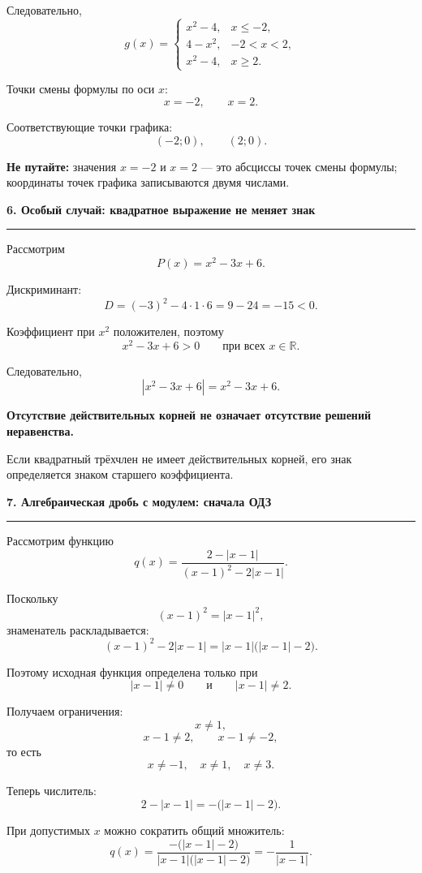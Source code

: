 \documentclass[a4paper,12pt]{article}
\newcommand{\lessonsection}[1]{%
    \vspace{0.6em}
    {\Large\bfseries\color{darkaccent}#1}\par
    \vspace{0.15em}
    {\color{softgray}\rule{\linewidth}{0.8pt}}
    \vspace{0.3em}
}
\newcommand{\important}[1]{%
    {\color{darkaccent}\bfseries #1}%
}
\newcommand{\R}{\mathbb{R}}
\begin{document}
Следовательно,
\[
\boxed{
g(x)=
\begin{cases}
x^2-4, & x\le -2,\\[1mm]
4-x^2, & -2<x<2,\\[1mm]
x^2-4, & x\ge 2.
\end{cases}}
\]

Точки смены формулы по оси \(x\):
\[
\boxed{x=-2,\qquad x=2}.
\]

Соответствующие точки графика:
\[
(-2;0),\qquad (2;0).
\]

\textbf{Не путайте:}
значения \(x=-2\) и \(x=2\) --- это абсциссы точек смены формулы;
координаты точек графика записываются двумя числами.


\lessonsection{6. Особый случай: квадратное выражение не меняет знак}

Рассмотрим
\[
P(x)=x^2-3x+6.
\]

Дискриминант:
\[
D=(-3)^2-4\cdot1\cdot6=9-24=-15<0.
\]

Коэффициент при \(x^2\) положителен, поэтому
\[
x^2-3x+6>0
\qquad\text{при всех }x\in\R.
\]

Следовательно,
\[
|x^2-3x+6|=x^2-3x+6.
\]

\important{Отсутствие действительных корней не означает отсутствие решений
неравенства.}

Если квадратный трёхчлен не имеет действительных корней, его знак
определяется знаком старшего коэффициента.


\lessonsection{7. Алгебраическая дробь с модулем: сначала ОДЗ}

Рассмотрим функцию
\[
q(x)=
\frac{2-|x-1|}
{(x-1)^2-2|x-1|}.
\]

Поскольку
\[
(x-1)^2=|x-1|^2,
\]
знаменатель раскладывается:
\[
(x-1)^2-2|x-1|
=
|x-1|\bigl(|x-1|-2\bigr).
\]

Поэтому исходная функция определена только при
\[
|x-1|\ne0
\qquad\text{и}\qquad
|x-1|\ne2.
\]

Получаем ограничения:
\[
x\ne1,
\]
\[
x-1\ne2,\qquad x-1\ne-2,
\]
то есть
\[
\boxed{x\ne-1,\quad x\ne1,\quad x\ne3}.
\]

Теперь числитель:
\[
2-|x-1|=
-\bigl(|x-1|-2\bigr).
\]

При допустимых \(x\) можно сократить общий множитель:
\[
q(x)=
\frac{-\bigl(|x-1|-2\bigr)}
{|x-1|\bigl(|x-1|-2\bigr)}
=
-\frac{1}{|x-1|}.
\]
\end{document}
